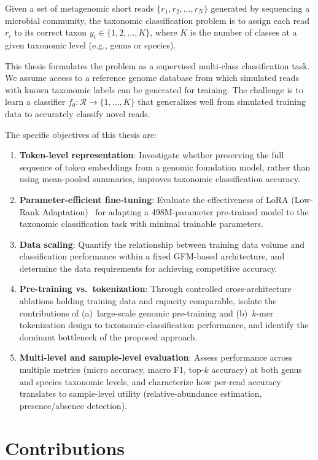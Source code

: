 Given a set of metagenomic short reads $\{r_1, r_2, \ldots, r_N\}$ generated by sequencing a microbial community, the taxonomic classification problem is to assign each read $r_i$ to its correct taxon $y_i \in \{1, 2, \ldots, K\}$, where $K$ is the number of classes at a given taxonomic level (e.g., genus or species).

This thesis formulates the problem as a supervised multi-class classification task. We assume access to a reference genome database from which simulated reads with known taxonomic labels can be generated for training. The challenge is to learn a classifier $f_\theta: \mathcal{R} \rightarrow \{1, \ldots, K\}$ that generalizes well from simulated training data to accurately classify novel reads.

The specific objectives of this thesis are:
\begin{enumerate}
    \item \textbf{Token-level representation}: Investigate whether preserving the full sequence of token embeddings from a genomic foundation model, rather than using mean-pooled summaries, improves taxonomic classification accuracy.
    \item \textbf{Parameter-efficient fine-tuning}: Evaluate the effectiveness of LoRA (Low-Rank Adaptation)~\cite{Hu2022} for adapting a 498M-parameter pre-trained model to the taxonomic classification task with minimal trainable parameters.
    \item \textbf{Data scaling}: Quantify the relationship between training data volume and classification performance within a fixed GFM-based architecture, and determine the data requirements for achieving competitive accuracy.
    \item \textbf{Pre-training vs.\ tokenization}: Through controlled cross-architecture ablations holding training data and capacity comparable, isolate the contributions of (a)~large-scale genomic pre-training and (b)~$k$-mer tokenization design to taxonomic-classification performance, and identify the dominant bottleneck of the proposed approach.
    \item \textbf{Multi-level and sample-level evaluation}: Assess performance across multiple metrics (micro accuracy, macro F1, top-$k$ accuracy) at both genus and species taxonomic levels, and characterize how per-read accuracy translates to sample-level utility (relative-abundance estimation, presence/absence detection).
\end{enumerate}

\section{Contributions}
\label{sec:intro-contributions}

